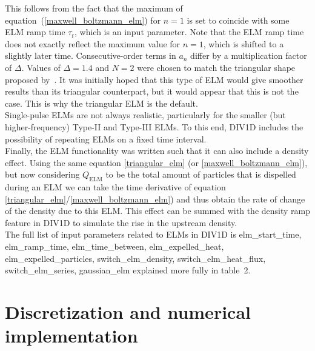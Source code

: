 \documentclass[amsmath,amssymb,a4]{revtex4-2}
\begin{document}
This follows from the fact that the maximum of equation~(\ref{maxwell_boltzmann_elm}) for $n=1$ is set to coincide with some ELM ramp time $\tau_{\mathrm{r}}$, which is an input parameter. Note that the ELM ramp time does not exactly reflect the maximum value for $n=1$, which is shifted to a slightly later time. Consecutive-order terms in $a_n$ differ by a multiplication factor of $\Delta$. Values of $\Delta=1.4$ and $N=2$ were chosen to match the triangular shape proposed by~\cite{eich2017}. It was initially hoped that this type of ELM would give smoother results than its triangular counterpart, but it would appear that this is not the case. This is why the triangular ELM is the default.\\

Single-pulse ELMs are not always realistic, particularly for the smaller (but higher-frequency) Type-II and Type-III ELMs. To this end, DIV1D includes the possibility of repeating ELMs on a fixed time interval.\\

Finally, the ELM functionality was written such that it can also include a density effect. Using the same equation \ref{triangular_elm} (or \ref{maxwell_boltzmann_elm}), but now considering $Q_{\mathrm{ELM}}$ to be the total amount of particles that is dispelled during an ELM we can take the time derivative of equation \ref{triangular_elm}/\ref{maxwell_boltzmann_elm}) and thus obtain the rate of change of the density due to this ELM. This effect can be summed with the density ramp feature in DIV1D to simulate the rise in the upstream density.\\

The full list of input parameters related to ELMs in DIV1D is
elm\_start\_time,
elm\_ramp\_time,
elm\_time\_between,
elm\_expelled\_heat,
elm\_expelled\_particles,
switch\_elm\_density,
switch\_elm\_heat\_flux,
switch\_elm\_series,
gaussian\_elm
explained more fully in table~2.

\section{Discretization and numerical implementation}\label{numerics}
\end{document}
